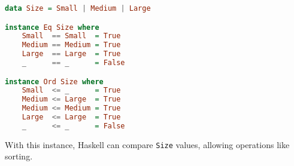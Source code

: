 \begin{lstlisting}[style=haskellstyle, language=Haskell]
data Size = Small | Medium | Large

instance Eq Size where
    Small  == Small  = True
    Medium == Medium = True
    Large  == Large  = True
    _      == _      = False

instance Ord Size where
    Small  <= _      = True
    Medium <= Large  = True
    Medium <= Medium = True
    Large  <= Large  = True
    _      <= _      = False
\end{lstlisting}
With this instance, Haskell can compare \texttt{Size} values, allowing operations like sorting.


